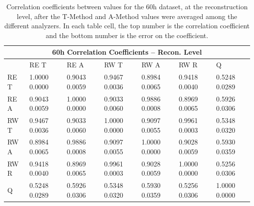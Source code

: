 \begin{table}[t]
\setlength\tabcolsep{15pt}
\footnotesize
\centering
\renewcommand{\arraystretch}{1.4}
\begin{tabularx}{0.8\linewidth}{@{\extracolsep{\fill}}lXXXXXX}
  \toprule
  	\multicolumn{7}{c}{{\normalsize 60h Correlation Coefficients -- Recon. Level}} \\
  \midrule
  	       & RE T & RE A & RW T & RW A & RW R & \quad Q \\
  \midrule
	RE T   & 1.0000 0.0000 & 0.9043 0.0059 & 0.9467 0.0036 & 0.8984 0.0065 & 0.9418 0.0040 & 0.5248 0.0289  \\
	RE A   & 0.9043 0.0059 & 1.0000 0.0000 & 0.9033 0.0060 & 0.9886 0.0008 & 0.8969 0.0065 & 0.5926 0.0306  \\
	RW T   & 0.9467 0.0036 & 0.9033 0.0060 & 1.0000 0.0000 & 0.9097 0.0055 & 0.9961 0.0003 & 0.5348 0.0320  \\
	RW A   & 0.8984 0.0065 & 0.9886 0.0008 & 0.9097 0.0055 & 1.0000 0.0000 & 0.9028 0.0059 & 0.5930 0.0359  \\
	RW R   & 0.9418 0.0040 & 0.8969 0.0065 & 0.9961 0.0003 & 0.9028 0.0059 & 1.0000 0.0000 & 0.5256 0.0306  \\
	Q      & 0.5248 0.0289 & 0.5926 0.0306 & 0.5348 0.0320 & 0.5930 0.0359 & 0.5256 0.0306 & 1.0000 0.0000  \\
  \bottomrule
\end{tabularx}
\caption[]{Correlation coefficients between \R values for the 60h dataset, at the reconstruction level, after the \RW T-Method and A-Method \R values were averaged among the different analyzers. In each table cell, the top number is the correlation coefficient and the bottom number is the error on the coefficient.}
\label{tab:Corrs_60h_recon}
\end{table}



